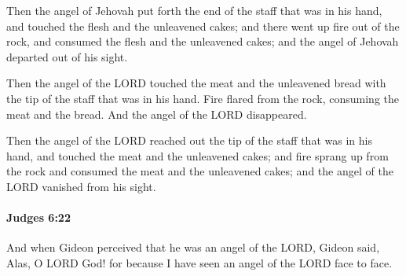 			\begin{versebox}
					\item[BHS] 
					\item[ASV] Then the angel of Jehovah put forth the end of the staff that was in his hand, and touched the flesh and the unleavened cakes; and there went up fire out of the rock, and consumed the flesh and the unleavened cakes; and the angel of Jehovah departed out of his sight.
					\item[NIV] Then the angel of the LORD touched the meat and the unleavened bread with the tip of the staff that was in his hand. Fire flared from the rock, consuming the meat and the bread. And the angel of the LORD disappeared.
					\item[NRSV] Then the angel of the LORD reached out the tip of the staff that was in his hand, and touched the meat and the unleavened cakes; and fire sprang up from the rock and consumed the meat and the unleavened cakes; and the angel of the LORD vanished from his sight.
			\end{versebox}

		\paragraph{Judges 6:22} %
			\label{JUDGES-6-22}

			And when Gideon perceived that he was an angel of the LORD, Gideon said, Alas, O LORD God! for because I have seen an angel of the LORD face to face.

